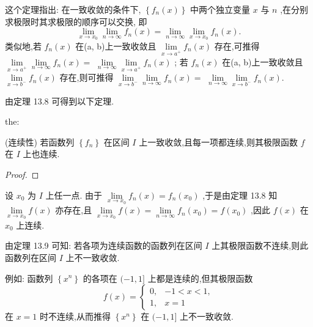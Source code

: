 这个定理指出: 在一致收敛的条件下, \(\left\{  {{f}_{n}\left( x\right) }\right\}\) 中两个独立变量 \(x\) 与 \(n\) ,在分别求极限时其求极限的顺序可以交换, 即
\[
\mathop{\lim }\limits_{{x \rightarrow  {x}_{0}}}\mathop{\lim }\limits_{{n \rightarrow  \infty }}{f}_{n}\left( x\right)  = \mathop{\lim }\limits_{{n \rightarrow  \infty }}\mathop{\lim }\limits_{{x \rightarrow  {x}_{0}}}{f}_{n}\left( x\right) . \tag{2}
\]
类似地,若 \({f}_{n}\left( x\right)\) 在(a, b)上一致收敛且 \(\mathop{\lim }\limits_{{x \rightarrow  {a}^{ + }}}{f}_{n}\left( x\right)\) 存在,可推得 \(\mathop{\lim }\limits_{{x \rightarrow  {a}^{ + }}}\mathop{\lim }\limits_{{n \rightarrow  \infty }}{f}_{n}\left( x\right)  =\)  \(\mathop{\lim }\limits_{{n \rightarrow  \infty }}\mathop{\lim }\limits_{{x \rightarrow  {a}^{ + }}}{f}_{n}\left( x\right)\) ; 若 \({f}_{n}\left( x\right)\) 在(a, b)上一致收敛且 \(\mathop{\lim }\limits_{{x \rightarrow  {b}^{ - }}}{f}_{n}\left( x\right)\) 存在,则可推得 \(\mathop{\lim }\limits_{{x \rightarrow  {b}^{ - }}}\mathop{\lim }\limits_{{n \rightarrow  \infty }}{f}_{n}\left( x\right)  =\)  \(\mathop{\lim }\limits_{{n \rightarrow  \infty }}\mathop{\lim }\limits_{{x \rightarrow  {b}^{ - }}}{f}_{n}\left( x\right) .\)

由定理 13.8 可得到以下定理.

\begin{theorem}{}{the:}

\end{theorem}
 (连续性) 若函数列 \(\left\{  {f}_{n}\right\}\) 在区间 \(I\) 上一致收敛,且每一项都连续,则其极限函数 \(f\) 在 \(I\) 上也连续.

\begin{proof}

\end{proof}
设 \({x}_{0}\) 为 \(I\) 上任一点. 由于 \(\mathop{\lim }\limits_{{x \rightarrow  {x}_{0}}}{f}_{n}\left( x\right)  = {f}_{n}\left( {x}_{0}\right)\) ,于是由定理 13.8 知 \(\mathop{\lim }\limits_{{x \rightarrow  {x}_{0}}}f\left( x\right)\) 亦存在,且 \(\mathop{\lim }\limits_{{x \rightarrow  {x}_{0}}}f\left( x\right)  = \mathop{\lim }\limits_{{n \rightarrow  \infty }}{f}_{n}\left( {x}_{0}\right)  = f\left( {x}_{0}\right)\) ,因此 \(f\left( x\right)\) 在 \({x}_{0}\) 上连续.

由定理 13.9 可知: 若各项为连续函数的函数列在区间 \(I\) 上其极限函数不连续,则此函数列在区间 \(I\) 上不一致收敛.

例如: 函数列 \(\left\{  {x}^{n}\right\}\) 的各项在 \(( - 1,1\rbrack\) 上都是连续的,但其极限函数
\[
f\left( x\right)  = \left\{  \begin{array}{ll} 0, &  - 1 < x < 1, \\  1, & x = 1 \end{array}\right.
\]
在 \(x = 1\) 时不连续,从而推得 \(\left\{  {x}^{n}\right\}\) 在 \(( - 1,1\rbrack\) 上不一致收敛.

